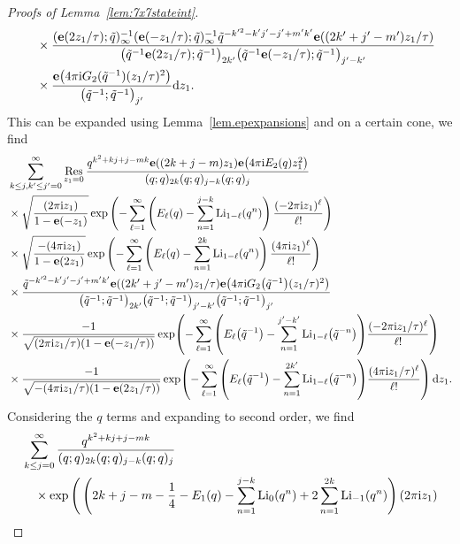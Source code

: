 \documentclass[pdftex]{sigma}
\numberwithin{equation}{section}
\def\tq{\tilde{q}}
\def\Res{\mathrm{Res}}
\def\Li{\mathrm{Li}}
\def\e{\mathbf e}
\def\tq{\tilde{q}}
\def\Res{\mathrm{Res}}
\def\Li{\operatorname{Li}}
\begin{document}
\begin{proof}[Proofs of Lemma~\ref{lem:7x7stateint}]
\begin{align*}
 & \quad{}\times\frac{(\e(2z_1/\tau);\tq)_{\infty}^{-1}(\e(-z_1/\tau);\tq)_{\infty}^{-1}\tq^{-k'^2-k'j'-j'+m'k'}\e((2k'+j'-m')z_1/\tau)}{\bigl(\tq^{-1}\e(2z_1/\tau);\tq^{-1}\bigr)_{2k'}\bigl(\tq^{-1}\e(-z_1/\tau);\tq^{-1}\bigr)_{j'-k'} }\\
 &\quad\times\frac{\e\bigl(4\pi {\rm i}G_2(\tq^{-1})(z_1/\tau)^2\bigr)}{\bigl(\tq^{-1};\tq^{-1}\bigr)_{j'}} {\rm d}z_1.
\end{align*}
This can be expanded using Lemma~\ref{lem.epexpansions} and on a certain cone, we find
\begin{align*}
 &\sum_{k\leq j,k'\leq j'=0}^{\infty}\mathop{\Res}\limits_{z_1=0}\frac{q^{k^2+kj+j-mk}\e((2k+j-m)z_{1})\e\bigl(4\pi {\rm i} E_2(q)z_1^2\bigr)}{(q;q)_{2k}(q;q)_{j-k}(q;q)_{j}}\\
 & \times\sqrt{\frac{(2\pi {\rm i}z_1)}{1-\e(-z_1)}}\exp\left(-\sum_{\ell=1}^{\infty}\left(E_{\ell}(q)-\sum_{n=1}^{j-k}\Li_{1-\ell}(q^{n})\right)\frac{(-2\pi {\rm i}z_1)^\ell}{\ell!}\right)\\
 & \times\sqrt{\frac{-(4\pi {\rm i} z_1)}{1-\e(2z_1)}}\exp\left(-\sum_{\ell=1}^{\infty}\left(E_{\ell}(q)-\sum_{n=1}^{2k}\Li_{1-\ell}(q^{n})\right)\frac{(4\pi {\rm i}z_1)^\ell}{\ell!}\right)\\
 & \times\frac{\tq^{-k'^2-k'j'-j'+m'k'}\e((2k'+j'-m')z_1/\tau)\e\bigl(4\pi {\rm i} G_2\bigl(\tq^{-1}\bigr)(z_1/\tau)^2\bigr)}{\bigl(\tq^{-1};\tq^{-1}\bigr)_{2k'}\bigl(\tq^{-1};\tq^{-1}\bigr)_{j'-k'}\bigl(\tq^{-1};\tq^{-1}\bigr)_{j'}}\\
 & \times\frac{-1}{\sqrt{(2\pi {\rm i}z_1/\tau)(1-\e(-z_1/\tau))}}\exp \! \left(-\sum_{\ell=1}^{\infty}\left(E_{\ell}\bigl(\tq^{-1}\bigr)-\sum_{n=1}^{j'-k'}\Li_{1-\ell}\bigl(\tq^{-n}\bigr)\right) \!\frac{(-2\pi {\rm i}z_1/\tau)^{\ell}}{\ell!}\right)\\
 & \times\frac{-1}{\sqrt{-(4\pi {\rm i}z_1/\tau)(1-\e(2z_1/\tau))}}\exp\!\left(-\sum_{\ell=1}^{\infty}\left(E_{\ell}\bigl(\tq^{-1}\bigr)-\sum_{n=1}^{2k'}\Li_{1-\ell}\bigl(\tq^{-n}\bigr)\right)\! \frac{(4\pi {\rm i}z_1/\tau)^{\ell}}{\ell!}\right){\rm d}z_1 .
\end{align*}
Considering the $q$ terms and expanding to second order, we find
\begin{align}
 &\sum_{k\leq j=0}^{\infty}\frac{q^{k^2+kj+j-mk}}{(q;q)_{2k}(q;q)_{j-k}(q;q)_{j}}\nonumber\\
 &\quad\times\exp\Bigg(\left(2k+j-m-\frac{1}{4}-E_{1}(q)-\sum_{n=1}^{j-k}\Li_{0}(q^{n})+2\sum_{n=1}^{2k}\Li_{-1}(q^{n})\right)(2\pi {\rm i}z_{1})\nonumber\\

\end{align}
\end{proof}
\end{document}
